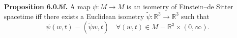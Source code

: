 \textbf{Proposition 6.0.5f.} A map $\psi: M \to M$ is an isometry of Einstein--de Sitter spacetime iff there exists a Euclidean isometry $\tilde{\psi}: \mathbb{R}^3 \to \mathbb{R}^3$ such that
$$\psi(w, t) = (\tilde{\psi} w, t) \quad \forall (w, t) \in M = \mathbb{R}^3 \times (0, \infty).$$
